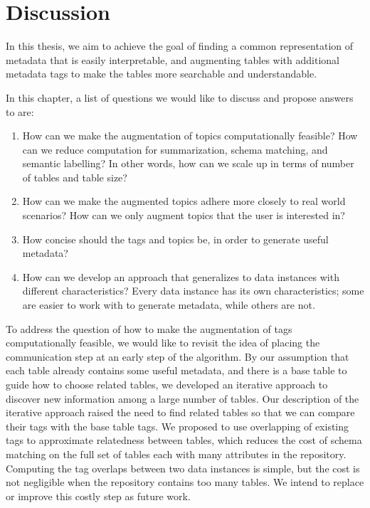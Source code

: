 
\chapter{Discussion}
\label{ch:Discussions}

In this thesis, we aim to achieve the goal of finding a common representation of metadata that is easily interpretable, and augmenting tables with additional metadata tags to make the tables more searchable and understandable.

In this chapter, a list of questions we would like to discuss and propose answers to are:
\begin{enumerate}
\item How can we make the augmentation of topics computationally feasible? How can we reduce computation for summarization, schema matching, and semantic labelling? In other words, how can we scale up in terms of number of tables and table size?
\item How can we make the augmented topics adhere more closely to real world scenarios? How can we only augment topics that the user is interested in?
\item How concise should the tags and topics be, in order to generate useful metadata?
\item How can we develop an approach that generalizes to data instances with different characteristics? Every data instance has its own characteristics; some are easier to work with to generate metadata, while others are not.	
\end{enumerate}

To address the question of how to make the augmentation of tags computationally feasible, we would like to revisit the idea of placing the communication step at an early step of the algorithm. By our assumption that each table already contains some useful metadata, and there is a base table to guide how to choose related tables, we developed an iterative approach to discover new information among a large number of tables. Our description of the iterative approach raised the need to find related tables so that we can compare their tags with the base table tags. We proposed to use overlapping of existing tags to approximate relatedness between tables, which reduces the cost of schema matching on the full set of tables each with many attributes in the repository. Computing the tag overlaps between two data instances is simple, but the cost is not negligible when the repository contains too many tables. We intend to replace or improve this costly step as future work.

